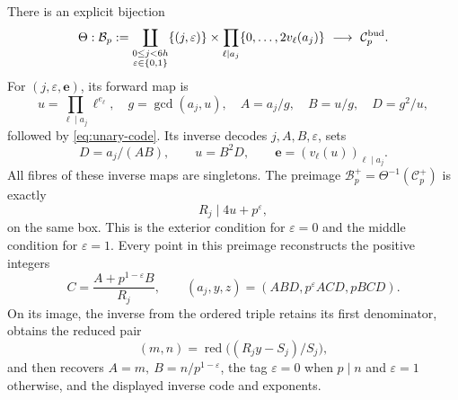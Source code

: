 \begin{theorem}
\label{thm:unary-box}
There is an explicit bijection
\[
 \Theta:\mathcal B_p:=
 \coprod_{\substack{0\le j<6h\\\varepsilon\in\{0,1\}}}
 \{(j,\varepsilon)\}\times
 \prod_{\ell\mid a_j}\{0,\ldots,2v_\ell(a_j)\}
 \ \longrightarrow\ \mathcal C_p^{\rm bud}.
\]
For \((j,\varepsilon,\boldsymbol e)\), its forward map is
\[
 u=\prod_{\ell\mid a_j}\ell^{e_\ell},\quad
 g=\gcd(a_j,u),\quad A=a_j/g,\quad B=u/g,\quad D=g^2/u,
\]
followed by \eqref{eq:unary-code}.
Its inverse decodes \(j,A,B,\varepsilon\), sets
\[
 D=a_j/(AB),\qquad u=B^2D,\qquad
 \boldsymbol e=(v_\ell(u))_{\ell\mid a_j}.
\]
All fibres of these inverse maps are singletons.
The preimage \(\mathcal B_p^+=\Theta^{-1}(\mathcal C_p^+)\)
is exactly
\[
 R_j\mid 4u+p^\varepsilon,
\]
on the same box.  This is the exterior condition for \(\varepsilon=0\)
and the middle condition for \(\varepsilon=1\).
Every point in this preimage reconstructs the positive integers
\begin{equation}\label{eq:unary-integer-lift}
 C=\frac{A+p^{1-\varepsilon}B}{R_j},\qquad
 (a_j,y,z)=(ABD,p^\varepsilon ACD,pBCD).
\end{equation}
On its image, the inverse from the ordered triple retains its first
denominator, obtains the reduced pair
\[
 (m,n)=\operatorname{red}\big((R_jy-S_j)/S_j\big),
\]
and then recovers \(A=m,\ B=n/p^{1-\varepsilon}\), the tag
\(\varepsilon=0\) when \(p\mid n\) and \(\varepsilon=1\) otherwise,
and the displayed inverse code and exponents.
\end{theorem}
